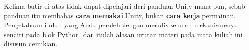 \begin{catatabox}
Kelima butir di atas tidak dapat dipelajari dari panduan
Unity mana pun, sebab panduan itu membahas \textbf{cara memakai} Unity, bukan
\textbf{cara kerja} permainan. Pengetahuan itulah yang Anda peroleh dengan
menulis seluruh mekanismenya sendiri pada blok Python, dan itulah alasan urutan
materi pada mata kuliah ini disusun demikian.
\end{catatabox}
